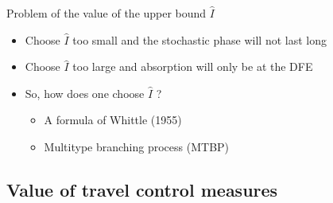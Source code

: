 \documentclass[aspectratio=169]{beamer}\usepackage[]{graphicx}\usepackage[]{xcolor}
\begin{document}

\begin{frame}{Problem of the value of the upper bound $\hat I$}
  \begin{itemize}
    \item Choose $\hat I$ too small and the stochastic phase will not last long
    \vfill
    \item Choose $\hat I$ too large and absorption will only be at the DFE
    \vfill
    \item So, how does one choose $\hat I$ ?
    \begin{itemize}
      \item A formula of Whittle (1955) \nocite{whittle1955}
      \item Multitype branching process (MTBP)
    \end{itemize}
  \end{itemize}
\end{frame}

\subsection{Value of travel control measures}
\end{document}
